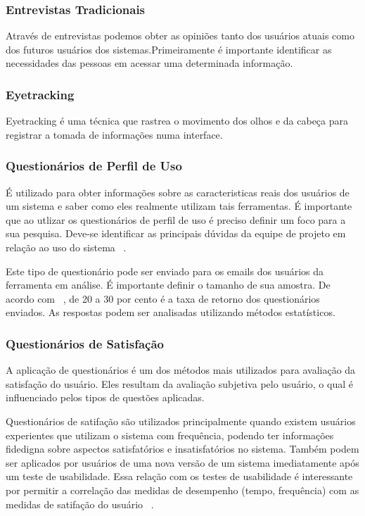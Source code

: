 \subsubsection{Entrevistas Tradicionais}

Através de entrevistas podemos obter as opiniões tanto dos usuários atuais como dos futuros usuários dos sistemas.Primeiramente é importante identificar as necessidades das pessoas em acessar uma determinada informação.

\subsubsection{Eyetracking}

Eyetracking é uma técnica que rastrea o movimento dos olhos e da cabeça para registrar a tomada de informações numa interface.

\subsubsection{Questionários de Perfil de Uso}
 
É utilizado para obter informações sobre as caracteristicas reais dos usuários de um sistema e saber como eles realmente utilizam tais ferramentas. É importante que ao utlizar os questionários de perfil de uso é preciso definir um foco para a sua pesquisa. Deve-se identificar as principais dúvidas da equipe de projeto em relação ao uso do sistema ~\cite{cybis2010}.

Este tipo de questionário pode ser enviado para os emails dos usuários da ferramenta em análise. É importante definir o tamanho de sua amostra. De acordo com ~, de 20 a 30 por cento é a taxa de retorno dos questionários enviados. As respostas podem ser analisadas utilizando métodos estatísticos.


\subsubsection{Questionários de Satisfação}

	A aplicação de questionários é um dos métodos mais utilizados para avaliação da satisfação do usuário. Eles resultam da avaliação subjetiva pelo usuário, o qual é influenciado pelos tipos de questões aplicadas.
	
	Questionários de satifação são utilizados principalmente quando existem usuários experientes que utilizam o sistema com frequência, podendo ter informações fidedigna sobre aspectos satisfatórios e insatisfatórios no sistema. Também podem ser aplicados por usuários de uma nova versão de um sistema imediatamente após um teste de usabilidade. Essa relação com os testes de usabilidade é interessante por permitir a correlação das medidas de desempenho (tempo, frequência) com as medidas de satifação do usuário ~\cite{cybis2010}.

